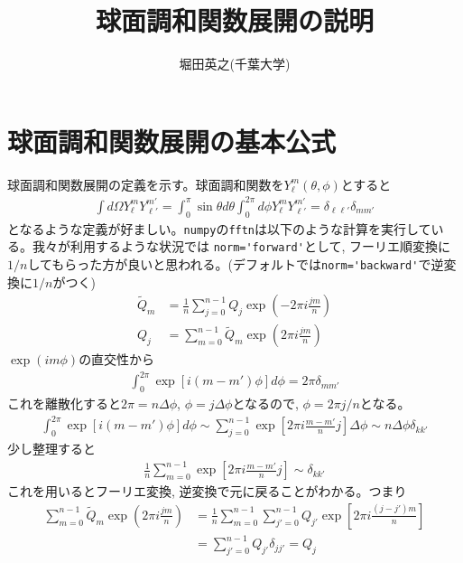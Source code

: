 \documentclass[a4j, 12pt]{ltjarticle}
\title{球面調和関数展開の説明}
\author{堀田英之(千葉大学)}
\begin{document}
    \maketitle
    \section{球面調和関数展開の基本公式}
    球面調和関数展開の定義を示す。球面調和関数を$Y_\ell^m(\theta,\phi)$とすると
    \begin{align}
        \int d\Omega Y_{\ell}^m Y_{\ell'}^{m'} = 
        \int_0^\pi \sin\theta d\theta\int_0^{2\pi} d\phi Y_{\ell}^m Y_{\ell'}^{m'} = \delta_{\ell\ell'}\delta_{mm'}
    \end{align}
    となるような定義が好ましい。\verb|numpy|の\verb|fftn|は以下のような計算を実行している。我々が利用するような状況では
    \verb|norm='forward'|として, フーリエ順変換に$1/n$してもらった方が良いと思われる。(デフォルトでは\verb|norm='backward'|で逆変換に$1/n$がつく)
    \begin{align}
        \tilde{Q}_m &= \frac{1}{n}\sum_{j=0}^{n-1} Q_j \exp\left(-2\pi i \frac{jm}{n}\right) \\
        Q_j &= \sum_{m=0}^{n-1} \tilde{Q}_m \exp\left(2\pi i\frac{jm}{n}\right)
    \end{align}
    $\exp(im\phi)$の直交性から
    \begin{align}
        \int_0^{2\pi} \exp\left[ i(m-m')\phi\right] d\phi = 2\pi \delta_{mm'}
    \end{align}
    これを離散化すると$2\pi=n\Delta \phi$, $\phi=j\Delta \phi$となるので, $\phi=2\pi j/n$となる。
    \begin{align}
        \int_0^{2\pi} \exp\left[ i(m-m')\phi\right] d\phi \sim
        \sum_{j=0}^{n-1} \exp\left[2\pi i \frac{m-m'}{n}j\right] \Delta \phi 
        \sim n\Delta \phi \delta_{kk'}
    \end{align}
    少し整理すると
    \begin{align}
        \frac{1}{n}\sum_{m=0}^{n-1} \exp\left[2\pi i \frac{m-m'}{n}j\right] \sim \delta_{kk'}
    \end{align}
    これを用いるとフーリエ変換, 逆変換で元に戻ることがわかる。つまり
    \begin{align}
        \sum_{m=0}^{n-1} \tilde{Q}_m \exp\left(2\pi i \frac{jm}{n}\right)
        &= \frac{1}{n}\sum_{m=0}^{n-1} \sum_{j'=0}^{n-1}Q_{j'} \exp\left[2\pi i \frac{(j-j')m}{n}\right] \\
        &= \sum_{j'=0}^{n-1}Q_{j'}\delta_{jj'} = Q_j
    \end{align}
\end{document}
